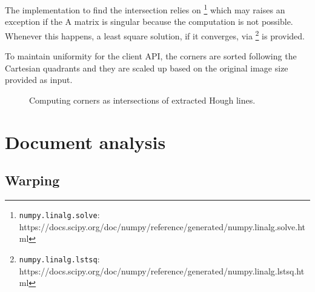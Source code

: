 \documentclass[a4paper]{article}
\begin{document}
The implementation to find the intersection relies on \footnote{ \texttt{numpy.linalg.solve}: https://docs.scipy.org/doc/numpy/reference/generated/numpy.linalg.solve.html} which may raises an exception if the A matrix is singular because the computation is not possible. Whenever this happens, a least square solution, if it converges, via \footnote{\texttt{numpy.linalg.lstsq}: https://docs.scipy.org/doc/numpy/reference/generated/numpy.linalg.lstsq.html} is provided.

To maintain uniformity for the client API, the corners are sorted following the Cartesian quadrants and they are scaled up based on the original image size provided as input.

\begin{figure}[H]
	\caption{Computing corners as intersections of extracted Hough lines.}
	\label{fig:computingcorners}
\end{figure}

\section{Document analysis}

\subsection{Warping}
\end{document}

